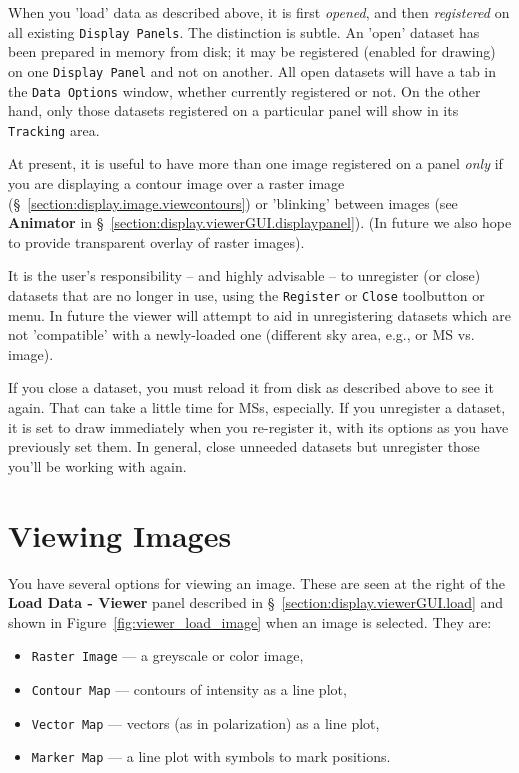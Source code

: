 When you 'load' data as described above, it is first {\em opened}, and then
{\em registered} on all existing {\tt Display Panels}.  The distinction
is subtle.  An 'open' dataset has been prepared in memory from disk; it
may be registered (enabled for drawing) on one {\tt Display Panel} and not
on another.  All open datasets will have a tab in the {\tt Data Options}
window, whether currently registered or not.  On the other hand, only those
datasets registered on a particular panel will show in its {\tt Tracking}
area.

At present, it is useful to have more than one image registered on a
panel {\em only} if you are displaying a contour image over a raster image
(\S~\ref{section:display.image.viewcontours}) or 'blinking' between images
(see {\bf Animator} in \S~\ref{section:display.viewerGUI.displaypanel}).
(In future we also hope to provide transparent overlay of raster images).

It is the user's responsibility -- and highly advisable -- to unregister
(or close) datasets that are no longer in use, using the {\tt Register}
or {\tt Close} toolbutton or menu.  In future the viewer will attempt
to aid in unregistering datasets which are not 'compatible' with a
newly-loaded one (different sky area, e.g., or MS vs. image).

If you close a dataset, you must reload it from disk as described above
to see it again.  That can take a little time for MSs, especially.  If you
unregister a dataset, it is set to draw immediately when you re-register it,
with its options as you have previously set them.  In general, close
unneeded datasets but unregister those you'll be working with again.

\section{Viewing Images}
\label{section:display.image}

You have several options for viewing an image.  These are seen
at the right of the {\bf Load Data - Viewer} panel 
described in \S~\ref{section:display.viewerGUI.load} and shown in 
Figure~\ref{fig:viewer_load_image} when an image is selected.  They are:
\begin{itemize}
   \item {\tt Raster Image} --- a greyscale or color image,
   \item {\tt Contour Map} --- contours of intensity as a line plot,
   \item {\tt Vector Map} --- vectors (as in polarization) as a line plot,
   \item {\tt Marker Map} --- a line plot with symbols to mark positions.
\end{itemize}

